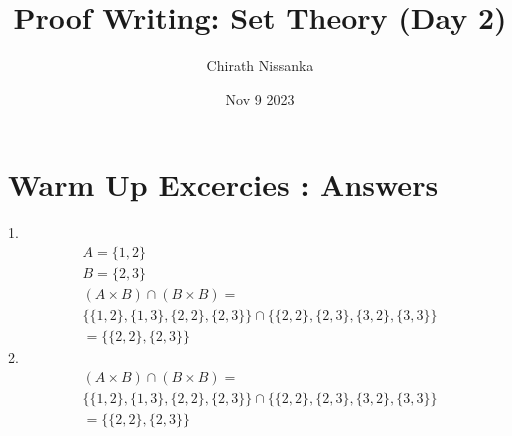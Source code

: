 \documentclass{article}
\author{Chirath Nissanka}
\title{Proof Writing: Set Theory (Day 2)}
\date{Nov 9 2023}
\begin{document}
    \maketitle
\section{Warm Up Excercies : Answers}
1.
\[
    \begin{split}
       A = \{1,2\} \\ B = \{2,3\} \\
       (A \times B) \cap (B \times B) = \\ 
       \{\{1,2\},\{1,3\},\{2,2\},\{2,3\}\} \cap \{\{2,2\},\{2,3\},\{3,2\},\{3,3\}\}        
        \\= \{\{2,2\},\{2,3\}\}
    \end{split}
\]
2.
\[
    \begin{split}
       (A \times B) \cap (B \times B) = \\ 
       \{\{1,2\},\{1,3\},\{2,2\},\{2,3\}\} \cap \{\{2,2\},\{2,3\},\{3,2\},\{3,3\}\}        
        \\= \{\{2,2\},\{2,3\}\}
    \end{split}
\]
\end{document}
